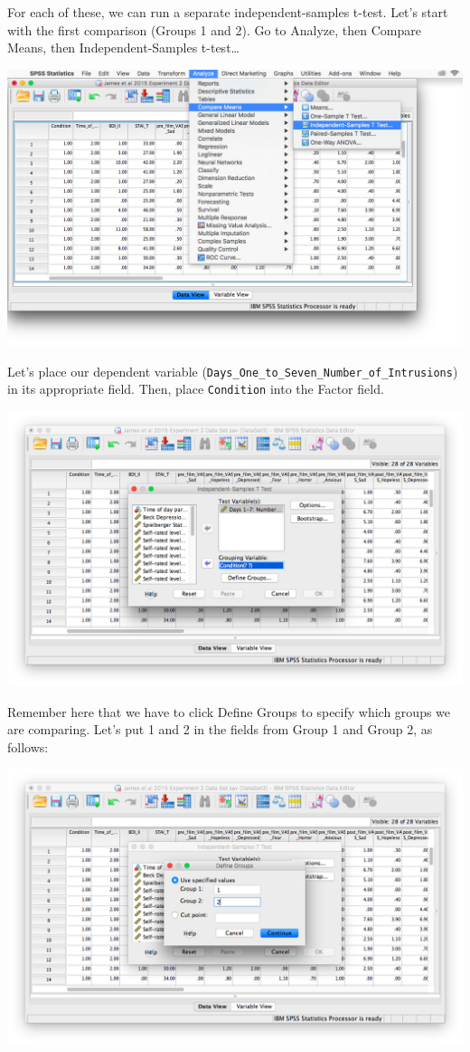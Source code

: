 \documentclass[
]{book}
\begin{document}
For each of these, we can run a separate independent-samples t-test. Let's start with the first comparison (Groups 1 and 2). Go to {Analyze}, then {Compare Means}, then {Independent-Samples t-test\ldots{}}

\includegraphics{img/8.4.16.png}

Let's place our dependent variable (\texttt{Days\_One\_to\_Seven\_Number\_of\_Intrusions}) in its appropriate field. Then, place \texttt{Condition} into the Factor field.

\includegraphics{img/8.4.17.png}

Remember here that we have to click {Define Groups} to specify which groups we are comparing. Let's put 1 and 2 in the fields from Group 1 and Group 2, as follows:

\includegraphics{img/8.4.18.png}
\end{document}
